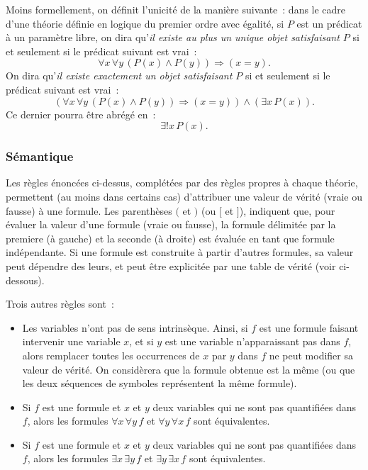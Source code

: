 Moins formellement, on définit l'unicité de la manière suivante : dans le cadre d'une théorie définie en logique du premier ordre avec égalité, si $P$ est un prédicat à un paramètre libre, on dira qu'\textit{il existe au plus un unique objet satisfaisant $P$} si et seulement si le prédicat suivant est vrai : 
\begin{equation*}
    \forall x \, \forall y \, (P(x) \wedge P(y)) \Rightarrow (x = y).
\end{equation*}
On dira qu'\textit{il existe exactement un objet satisfaisant $P$} si et seulement si le prédicat suivant est vrai :
\begin{equation*}
    (\forall x \, \forall y \, (P(x) \wedge P(y)) \Rightarrow (x = y)) \wedge (\exists x \, P(x)).
\end{equation*}
Ce dernier pourra être abrégé en : 
\begin{equation*}
    \exists! x \, P(x).
\end{equation*}

\subsubsection{Sémantique}

Les règles énoncées ci-dessus, complétées par des règles propres à chaque théorie, permettent (au moins dans certains cas) d'attribuer une valeur de vérité (vraie ou fausse) à une formule. Les parenthèses $($ et $)$ (ou $[$ et $]$), indiquent que, pour évaluer la valeur d'une formule (vraie ou fausse), la formule délimitée par la premiere (à gauche) et la seconde (à droite) est évaluée en tant que formule indépendante. 
Si une formule est construite à partir d'autres formules, sa valeur peut dépendre des leurs, et peut être explicitée par une table de vérité (voir ci-dessous). 

Trois autres règles sont :
\begin{itemize}
    \item Les variables n'ont pas de sens intrinsèque. 
    Ainsi, si $f$ est une formule faisant intervenir une variable $x$, et si $y$ est une variable n'apparaissant pas dans $f$, alors remplacer toutes les occurrences de $x$ par $y$ dans $f$ ne peut modifier sa valeur de vérité. 
    On considèrera que la formule obtenue est la même (ou que les deux séquences de symboles représentent la même formule). 
    \item Si $f$ est une formule et $x$ et $y$ deux variables qui ne sont pas quantifiées dans $f$, alors les formules $\forall x \, \forall y \, f$ et $\forall y \, \forall x \, f$ sont équivalentes.
    \item Si $f$ est une formule et $x$ et $y$ deux variables qui ne sont pas quantifiées dans $f$, alors les formules $\exists x \, \exists y \, f$ et $\exists y \, \exists x \, f$ sont équivalentes.
\end{itemize}

